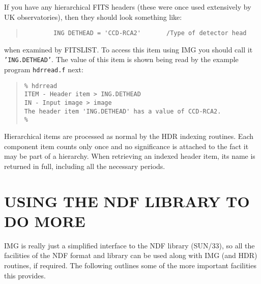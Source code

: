 \documentclass[twoside,11pt]{article}
\newcommand{\htmladdnormallink}[2]{#1}
\newcommand{\htmlref}[2]{#1}
\newcommand{\xref}[3]{#1}
\renewcommand{\_}{\texttt{\symbol{95}}}
\newcommand{\myverb}[1]{{\texttt{#1}}}
\newenvironment{code}{\begin{small} \begin{quote}}
                     {\end{quote} \end{small}}
\begin{document}
If you have any hierarchical FITS headers (these were once used
extensively by UK observatories), then they should look something
like:
\begin{code}
\begin{verbatim}
        ING DETHEAD = 'CCD-RCA2'       /Type of detector head
\end{verbatim}
\end{code}
when examined by \xref{FITSLIST}{sun95}{FITSLIST}.  To access this
item using IMG you should call it \myverb{'ING.DETHEAD'}.
The value of this item is shown being read by the example
program
\htmladdnormallink{\myverb{hdrread.f}}{../../bin/examples/img/hdrread.f}
 next:
\begin{code}
\begin{verbatim}
% hdrread
ITEM - Header item > ING.DETHEAD
IN - Input image > image
The header item 'ING.DETHEAD' has a value of CCD-RCA2.
%
\end{verbatim}
\end{code}
Hierarchical items are processed as normal by the HDR
\htmlref{indexing
routines}{HDRINDEXING}\latexonly{ (\S\ref{HDRINDEXING})}. Each
component item counts only once and no significance is attached to the
fact it may be part of a hierarchy. When retrieving an indexed header
item, its name is returned in full, including all the necessary
periods.

\section{USING THE NDF LIBRARY TO DO MORE}
IMG is really just a simplified interface to the NDF library
(\xref{SUN/33}{sun33}{}), so all the facilities of the NDF format and
library can be used along with IMG (and HDR) routines, if
required. The following outlines some of the more important
facilities this provides.
\end{document}
